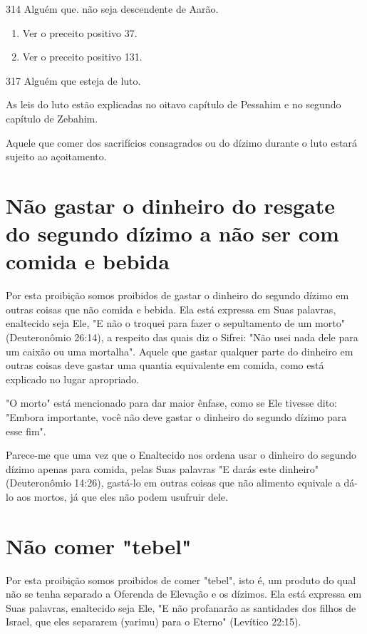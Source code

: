 \begin{itemize}
\begin{enumrate}
\begin{itemize}
\begin{itemize}
\begin{itemize}
314 Alguém que. não seja descendente de Aarão.


\begin{enumerate}
\def\labelenumi{\arabic{enumi}.}
\setcounter{enumi}{314}
\item
 
 Ver o preceito positivo 37.
 
\item
 
 Ver o preceito positivo 131.
 
\end{enumerate}


317 Alguém que esteja de luto.

As leis do luto estão explicadas no oitavo capítulo de Pessahim e no
segundo capítulo de Zebahim.

Aquele que comer dos sacrifícios consagrados ou do dízimo duran­te o
luto estará sujeito ao açoitamento.

\section{Não gastar o dinheiro do resgate do segundo dízimo a não ser com comida e bebida}

Por esta proibição somos proibidos de gastar o dinheiro do segun­do
dízimo em outras coisas que não comida e bebida. Ela está expressa em
Suas palavras, enaltecido seja Ele, "E não o troquei para fazer o
sepultamento de um morto" (Deuteronômio 26:14), a respeito das quais diz
o Sifrei: "Não usei nada dele para um caixão ou uma mortalha". Aquele
que gastar qualquer parte do dinheiro em outras coisas deve gastar uma
quantia equivalente em comida, co­mo está explicado no lugar apropriado.

"O morto" está mencionado para dar maior ênfase, como se Ele ti­vesse
dito: "Embora importante, você não deve gastar o dinheiro do segundo
dízimo para esse fim".

Parece-me que uma vez que o Enaltecido nos ordena usar o dinhei­ro do
segundo dízimo apenas para comida, pelas Suas palavras "E darás este
dinheiro" (Deuteronômio 14:26), gastá-lo em outras coisas que não
alimento equivale a dá-lo aos mortos, já que eles não podem usufruir
dele.

\section{Não comer "tebel"}

Por esta proibição somos proibidos de comer "tebel", isto é, um pro­duto
do qual não se tenha separado a Oferenda de Elevação e os dízimos. Ela
está expressa em Suas palavras, enaltecido seja Ele, "E não profanarão
as santi­dades dos filhos de Israel, que eles separarem (yarimu) para o
Eterno" (Levítico 22:15).



\end{itemize}
\end{itemize}
\end{itemize}
\end{enumrate}
\end{itemize}
